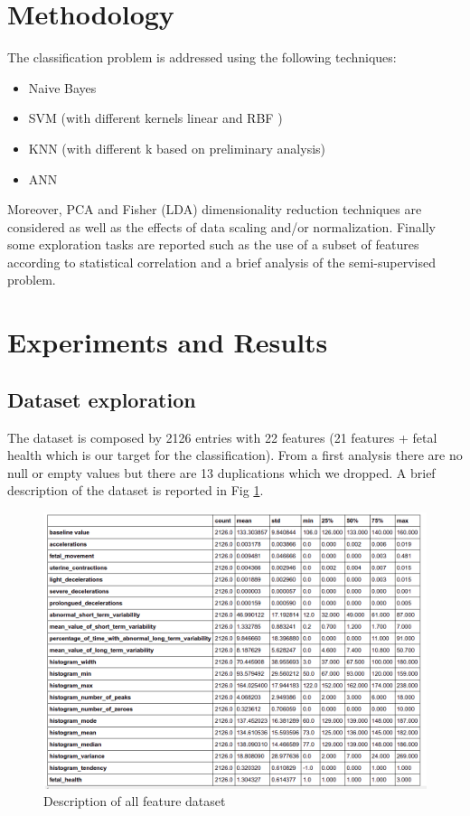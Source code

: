 \documentclass[a4paper,12pt]{article}
\begin{document}
\section{Methodology}
The classification problem is addressed using the following techniques:

\begin{itemize}
  \item Naive Bayes \cite{ml}
  \item SVM (with different kernels linear and RBF ) \cite{ml}
  \item KNN (with different k based on preliminary analysis) \cite{ml}
  \item ANN \cite{ann}
\end{itemize}
Moreover, PCA and Fisher (LDA) dimensionality reduction techniques are considered as well as the effects of data scaling and/or normalization. Finally some exploration tasks are reported such as the use of a subset of features according to statistical correlation and a brief analysis of the semi-supervised problem.
\section{Experiments and Results}
\subsection{Dataset exploration}
The dataset is composed by 2126 entries with 22 features (21 features + fetal health which is our target for the classification). From a first analysis there are no null or empty values but there are 13 duplications which we dropped. A brief description of the dataset is reported in Fig \ref{fig:features}.

\begin{figure}[H]
\begin{center}
\includegraphics[width=1.0\textwidth]{images/features.png}
\end{center}
\caption{Description of all feature dataset}
\label{fig:features}
\end{figure}
\end{document}
